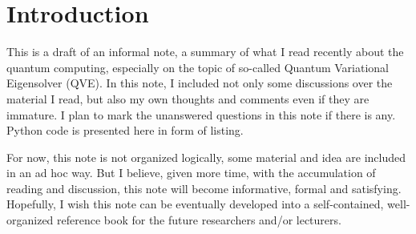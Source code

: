 \section{Introduction}
This is a draft of an informal note, a summary of what I read recently about the quantum computing, especially on the topic of so-called Quantum Variational Eigensolver (QVE). In this note, I included not only some discussions over the material I read, but also my own thoughts and comments even if they are immature. I plan to mark the unanswered questions in this note if there is any. Python code is presented here in form of listing.

For now, this note is not organized logically, some material and idea are included in an ad hoc way. But I believe, given more time, with the accumulation of reading and discussion, this note will become informative, formal and satisfying. Hopefully, I wish this note can be eventually developed into a self-contained, well-organized reference book for the future researchers and/or lecturers.